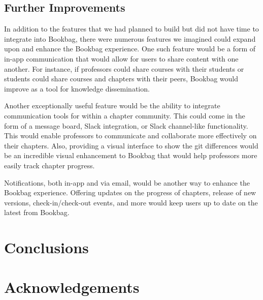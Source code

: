 \documentclass[pageno]{jpaper}
\begin{document}
\subsection{Further Improvements}

In addition to the features that we had planned to build but did not have time to integrate into Bookbag, there were numerous features we imagined could expand upon and enhance the Bookbag experience. One such feature would be a form of in-app communication that would allow for users to share content with one another. For instance, if professors could share courses with their students or students could share courses and chapters with their peers, Bookbag would improve as a tool for knowledge dissemination.

Another exceptionally useful feature would be the ability to integrate communication tools for within a chapter community. This could come in the form of a message board, Slack integration, or Slack channel-like functionality. This would enable professors to communicate and collaborate more effectively on their chapters. Also, providing a visual interface to show the git differences would be an incredible visual enhancement to Bookbag that would help professors more easily track chapter progress.

Notifications, both in-app and via email, would be another way to enhance the Bookbag experience. Offering updates on the progress of chapters, release of new versions, check-in/check-out events, and more would keep users up to date on the latest from Bookbag.

\section{Conclusions}

\section{Acknowledgements}
\end{document}
